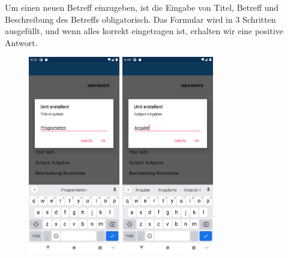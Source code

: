 \newpage
Um einen neuen Betreff einzugeben, ist die Eingabe von Titel, Betreff und Beschreibung des Betreffs obligatorisch. Das Formular wird in 3 Schritten ausgefüllt, und wenn alles korrekt eingetragen ist, erhalten wir eine positive Antwort.
\begin{figure}[h]
    \begin{center}
        \includegraphics[width=4cm]{pics/Xamarin Lehrer/5.png}\hfill
        \includegraphics[width=4cm]{pics/Xamarin Lehrer/6.png}
    \end{center}
\end{figure}
